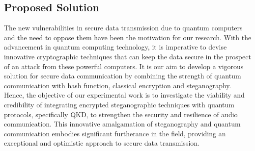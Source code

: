 \documentclass[a4paper]{cas-sc}
\begin{document}
\subsection{Proposed Solution}
The new vulnerabilities in secure data transmission due to quantum computers and the need to oppose them have been the motivation for our research. With the advancement in quantum computing technology, it is imperative to devise innovative cryptographic techniques that can keep the data secure in the prospect of an attack from these powerful computers. It is our aim to develop a vigorous solution for secure data communication by combining the strength of quantum communication with hash function, classical encryption and steganography. Hence, the objective of our experimental work is to investigate the viability and credibility of integrating encrypted steganographic techniques with quantum protocols, specifically QKD, to strengthen the security and resilience of audio communication. This innovative amalgamation of steganography and quantum communication embodies significant furtherance in the field, providing an exceptional and optimistic approach to secure data transmission.
\end{document}
